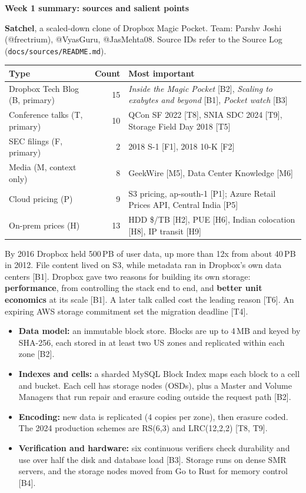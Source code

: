 \documentclass[10pt,a4paper]{article}
\newcommand{\src}[1]{{\color{black!55}\small[#1]}}
\newcommand{\sect}[1]{\vspace{5pt}{\large\bfseries #1}\par\vspace{1pt}}
\begin{document}
{\LARGE\bfseries Week 1 summary: sources and salient points}\par
\vspace{2pt}
\textbf{Satchel}, a scaled-down clone of Dropbox Magic Pocket.
Team: Parshv Joshi (@frectrium), @VyasGuru, @JasMehta08.
Source IDs refer to the Source Log (\texttt{docs/sources/README.md}).

\sect{Sources found}
\begin{tabularx}{\linewidth}{@{}l r X@{}}
\toprule
Type & Count & Most important \\
\midrule
Dropbox Tech Blog (B, primary) & 15 & \emph{Inside the Magic Pocket} [B2], \emph{Scaling to exabytes and beyond} [B1], \emph{Pocket watch} [B3] \\
Conference talks (T, primary) & 10 & QCon SF 2022 [T8], SNIA SDC 2024 [T9], Storage Field Day 2018 [T5] \\
SEC filings (F, primary) & 2 & 2018 S-1 [F1], 2018 10-K [F2] \\
Media (M, context only) & 8 & GeekWire [M5], Data Center Knowledge [M6] \\
Cloud pricing (P) & 9 & S3 pricing, ap-south-1 [P1]; Azure Retail Prices API, Central India [P5] \\
On-prem prices (H) & 13 & HDD \$/TB [H2], PUE [H6], Indian colocation [H8], IP transit [H9] \\
\bottomrule
\end{tabularx}

\sect{Problem: why Dropbox left S3}
By 2016 Dropbox held 500\,PB of user data, up more than 12x from about 40\,PB in 2012. File content lived on S3, while metadata ran in Dropbox's own data centers \src{B1}. Dropbox gave two reasons for building its own storage: \textbf{performance}, from controlling the stack end to end, and \textbf{better unit economics} at its scale \src{B1}. A later talk called cost the leading reason \src{T6}. An expiring AWS storage commitment set the migration deadline \src{T4}.

\sect{Solution: Magic Pocket}
\begin{itemize}
  \item \textbf{Data model:} an immutable block store. Blocks are up to 4\,MB and keyed by SHA-256, each stored in at least two US zones and replicated within each zone \src{B2}.
  \item \textbf{Indexes and cells:} a sharded MySQL Block Index maps each block to a cell and bucket. Each cell has storage nodes (OSDs), plus a Master and Volume Managers that run repair and erasure coding outside the request path \src{B2}.
  \item \textbf{Encoding:} new data is replicated (4 copies per zone), then erasure coded. The 2024 production schemes are RS(6,3) and LRC(12,2,2) \src{T8, T9}.
  \item \textbf{Verification and hardware:} six continuous verifiers check durability and use over half the disk and database load \src{B3}. Storage runs on dense SMR servers, and the storage nodes moved from Go to Rust for memory control \src{B4}.
\end{itemize}
\end{document}
